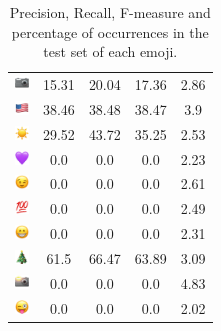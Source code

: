 \documentclass{article}
\begin{document}
\begin{table}
\begin{tabular}{|c|ccc|c|}
\includegraphics[height=0.37cm,width=0.37cm]{img/camera.png} & 15.31 & 20.04 & 17.36 & 2.86\\ 
\includegraphics[height=0.37cm,width=0.37cm]{img/United_States.png} & 38.46 & 38.48 & 38.47 & 3.9\\ 
\includegraphics[height=0.37cm,width=0.37cm]{img/sun.png} & 29.52 & 43.72 & 35.25 & 2.53\\ 
\includegraphics[height=0.37cm,width=0.37cm]{img/purple_heart.png} & 0.0 & 0.0 & 0.0 & 2.23\\ 
\includegraphics[height=0.37cm,width=0.37cm]{img/winking_face.png} & 0.0 & 0.0 & 0.0 & 2.61\\ 
\includegraphics[height=0.37cm,width=0.37cm]{img/hundred_points.png} & 0.0 & 0.0 & 0.0 & 2.49\\ 
\includegraphics[height=0.37cm,width=0.37cm]{img/beaming_face_with_smiling_eyes.png} & 0.0 & 0.0 & 0.0 & 2.31\\ 
\includegraphics[height=0.37cm,width=0.37cm]{img/Christmas_tree.png} & 61.5 & 66.47 & 63.89 & 3.09\\ 
\includegraphics[height=0.37cm,width=0.37cm]{img/camera_with_flash.png} & 0.0 & 0.0 & 0.0 & 4.83\\ 
\includegraphics[height=0.37cm,width=0.37cm]{img/winking_face_with_tongue.png} & 0.0 & 0.0 & 0.0 & 2.02\\ 

\hline
\end{tabular}
\caption{\label{table:emoji_detailed} Precision, Recall, F-measure and percentage of occurrences in the test set of each emoji.}
\end{table}
\end{document}

